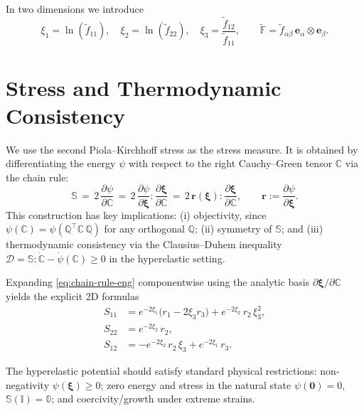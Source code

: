\documentclass[journal,article,submit,pdftex,moreauthors]{Definitions/mdpi}
\newcommand{\vect}[1]{\boldsymbol{#1}}
\begin{document}
In two dimensions we introduce
\begin{equation}
\xi_1=\ln(\tilde f_{11}),\quad \xi_2=\ln(\tilde f_{22}),\quad \xi_3=\frac{\tilde f_{12}}{\tilde f_{11}},\qquad \tilde{\mathbb F}=\tilde f_{\alpha\beta}\, \vect{e}_{\alpha}\otimes\vect{e}_{\beta}.
\label{eq:laplace_coords_eng}
\end{equation}

\section{Stress and Thermodynamic Consistency}
We use the second Piola–Kirchhoff stress as the stress measure. It is obtained by differentiating the energy $\psi$ with respect to the right Cauchy–Green tensor $\mathbb C$ via the chain rule:
\begin{equation}
  \mathbb S \,=\, 2\,\frac{\partial \psi}{\partial \mathbb C}
  \,=\, 2\,\frac{\partial \psi}{\partial \vect{\xi}} : \frac{\partial \vect{\xi}}{\partial \mathbb C}
  \,=\, 2\,\vect r(\vect{\xi}) : \frac{\partial \vect{\xi}}{\partial \mathbb C},\qquad \vect r := \frac{\partial \psi}{\partial \vect{\xi}}.
  \label{eq:chain-rule-eng}
\end{equation}
This construction has key implications: (i) objectivity, since $\psi(\mathbb C)=\psi(\mathbb Q^{\top}\mathbb C\,\mathbb Q)$ for any orthogonal $\mathbb Q$; (ii) symmetry of $\mathbb S$; and (iii) thermodynamic consistency via the Clausius–Duhem inequality $\mathcal D=\mathbb S: \dot{\mathbb C} - \dot{\psi}(\mathbb C)\ge 0$ in the hyperelastic setting.

Expanding \eqref{eq:chain-rule-eng} componentwise using the analytic basis $\partial \vect{\xi}/\partial \mathbb C$ yields the explicit 2D formulas
\begin{equation}
\begin{aligned}
  S_{11} &= e^{-2\xi_1}\big(r_1-2\xi_3 r_3\big) + e^{-2\xi_2} \, r_2\,\xi_3^2,\\
  S_{22} &= e^{-2\xi_2} \, r_2,\\
  S_{12} &= -e^{-2\xi_2} \, r_2\,\xi_3 + e^{-2\xi_1} \, r_3.
\end{aligned}
\label{eq:stress_components_2d_eng}
\end{equation}

The hyperelastic potential should satisfy standard physical restrictions: non-negativity $\psi(\vect{\xi})\ge 0$; zero energy and stress in the natural state $\psi(\vect 0)=0$, $\mathbb S(\mathbb I)=\mathbb 0$; and coercivity/growth under extreme strains.
\end{document}
